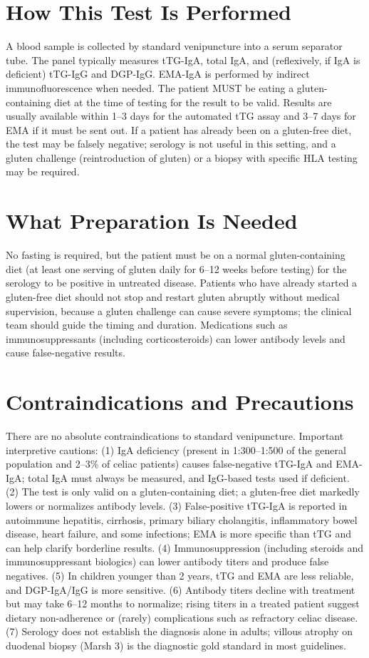 \section*{How This Test Is Performed}
A blood sample is collected by standard venipuncture into a serum separator tube. The panel typically measures tTG-IgA, total IgA, and (reflexively, if IgA is deficient) tTG-IgG and DGP-IgG. EMA-IgA is performed by indirect immunofluorescence when needed. The patient MUST be eating a gluten-containing diet at the time of testing for the result to be valid. Results are usually available within 1--3 days for the automated tTG assay and 3--7 days for EMA if it must be sent out. If a patient has already been on a gluten-free diet, the test may be falsely negative; serology is not useful in this setting, and a gluten challenge (reintroduction of gluten) or a biopsy with specific HLA testing may be required.

\section*{What Preparation Is Needed}
No fasting is required, but the patient must be on a normal gluten-containing diet (at least one serving of gluten daily for 6--12 weeks before testing) for the serology to be positive in untreated disease. Patients who have already started a gluten-free diet should not stop and restart gluten abruptly without medical supervision, because a gluten challenge can cause severe symptoms; the clinical team should guide the timing and duration. Medications such as immunosuppressants (including corticosteroids) can lower antibody levels and cause false-negative results.

\section*{Contraindications and Precautions}
There are no absolute contraindications to standard venipuncture. Important interpretive cautions: (1) IgA deficiency (present in 1:300--1:500 of the general population and 2--3\% of celiac patients) causes false-negative tTG-IgA and EMA-IgA; total IgA must always be measured, and IgG-based tests used if deficient. (2) The test is only valid on a gluten-containing diet; a gluten-free diet markedly lowers or normalizes antibody levels. (3) False-positive tTG-IgA is reported in autoimmune hepatitis, cirrhosis, primary biliary cholangitis, inflammatory bowel disease, heart failure, and some infections; EMA is more specific than tTG and can help clarify borderline results. (4) Immunosuppression (including steroids and immunosuppressant biologics) can lower antibody titers and produce false negatives. (5) In children younger than 2 years, tTG and EMA are less reliable, and DGP-IgA/IgG is more sensitive. (6) Antibody titers decline with treatment but may take 6--12 months to normalize; rising titers in a treated patient suggest dietary non-adherence or (rarely) complications such as refractory celiac disease. (7) Serology does not establish the diagnosis alone in adults; villous atrophy on duodenal biopsy (Marsh 3) is the diagnostic gold standard in most guidelines.

